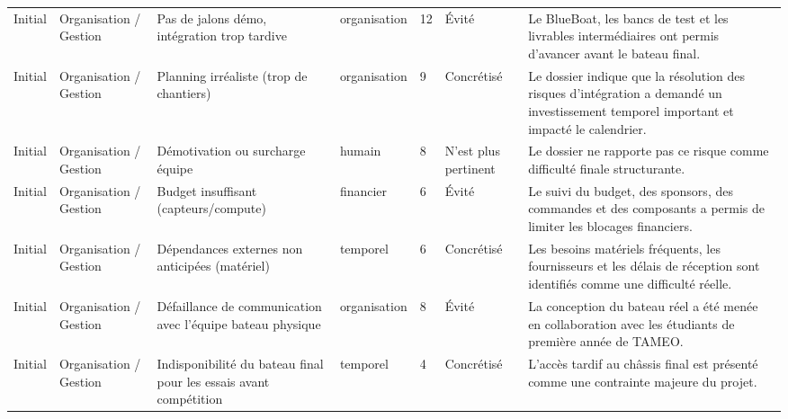 \documentclass[11pt,letterpaper]{article}
\begin{document}
\begin{longtable}{@{}L{1.55cm}L{2.05cm}L{3.25cm}L{1.95cm}L{1.05cm}L{2.15cm}L{3.55cm}@{}}
    Initial & Organisation / Gestion & Pas de jalons démo, intégration trop tardive & organisation & 12 & Évité & Le BlueBoat, les bancs de test et les livrables intermédiaires ont permis d'avancer avant le bateau final. \\
    Initial & Organisation / Gestion & Planning irréaliste (trop de chantiers) & organisation & 9 & Concrétisé & Le dossier indique que la résolution des risques d'intégration a demandé un investissement temporel important et impacté le calendrier. \\
    Initial & Organisation / Gestion & Démotivation ou surcharge équipe & humain & 8 & N'est plus pertinent & Le dossier ne rapporte pas ce risque comme difficulté finale structurante. \\
    Initial & Organisation / Gestion & Budget insuffisant (capteurs/compute) & financier & 6 & Évité & Le suivi du budget, des sponsors, des commandes et des composants a permis de limiter les blocages financiers. \\
    Initial & Organisation / Gestion & Dépendances externes non anticipées (matériel) & temporel & 6 & Concrétisé & Les besoins matériels fréquents, les fournisseurs et les délais de réception sont identifiés comme une difficulté réelle. \\
    Initial & Organisation / Gestion & Défaillance de communication avec l'équipe bateau physique & organisation & 8 & Évité & La conception du bateau réel a été menée en collaboration avec les étudiants de première année de TAMEO. \\
    Initial & Organisation / Gestion & Indisponibilité du bateau final pour les essais avant compétition & temporel & 4 & Concrétisé & L'accès tardif au châssis final est présenté comme une contrainte majeure du projet. \\


\end{longtable}
\end{document}
